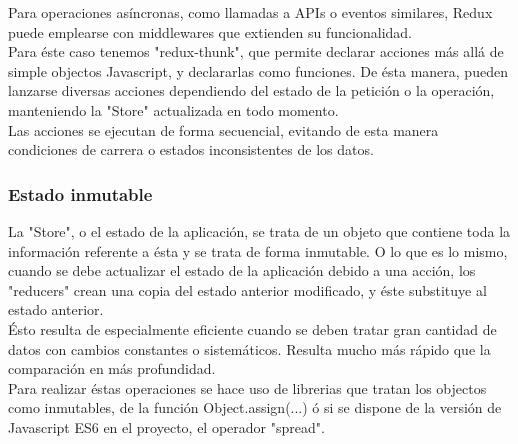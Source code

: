 Para operaciones asíncronas, como llamadas a APIs o eventos similares, Redux puede emplearse con middlewares que extienden su funcionalidad. \\ 
Para éste caso tenemos "redux-thunk", que permite declarar acciones más allá de simple objectos Javascript, y declararlas como funciones. De ésta manera, pueden lanzarse diversas acciones dependiendo del estado de la petición o la operación, manteniendo la "Store" actualizada en todo momento. \\

Las acciones se ejecutan de forma secuencial, evitando de esta manera condiciones de carrera o estados inconsistentes de los datos. \\

\subsubsection {Estado inmutable}

La "Store", o el estado de la aplicación, se trata de un objeto que contiene toda la información referente a ésta y se trata de forma inmutable. O lo que es lo mismo, cuando se debe actualizar el estado de la aplicación debido a una acción, los "reducers" crean una copia del estado anterior modificado, y éste substituye al estado anterior. \\

Ésto resulta de especialmente eficiente cuando se deben tratar gran cantidad de datos con cambios constantes o sistemáticos. Resulta mucho más rápido que la comparación en más profundidad. \\

Para realizar éstas operaciones se hace uso de librerias que tratan los objectos como inmutables, de la función Object.assign(...) ó si se dispone de la versión de Javascript ES6 en el proyecto, el operador "spread". \\

